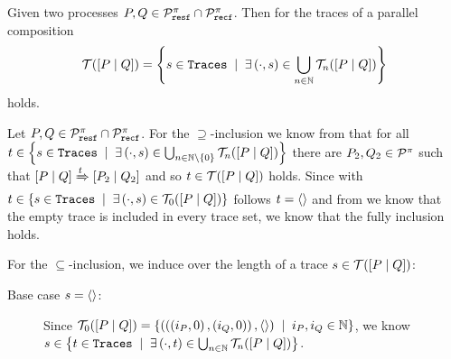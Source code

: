 \begin{lemma}
\label{lem_compositionality_traces_para}
Given two processes $P,Q\in\mathcal P^{\pi}_{\mathtt{resf}}\cap\mathcal P^{\pi}_{\mathtt{recf}}$. Then for the traces of a parallel composition
\[\traces[\procpar{P}{Q}]=\set[\exists\left(\cdot,s\right)\in\bigcup_{n\in\N}\tracesI{n}{P}{Q}]{s\in\tr}\]
holds.
\end{lemma}
\begin{prf}
Let $P,Q\in\mathcal P^{\pi}_{\mathtt{resf}}\cap\mathcal P^{\pi}_{\mathtt{recf}}$. For the $\supseteq$-inclusion we know from  that for all $t\in\set[\exists\left(\cdot,s\right)\in\bigcup_{n\in\N\setminus\set{0}}\tracesI{n}{P}{Q}]{s\in\tr}$ there are $P_2,Q_2\in\mathcal P^{\pi}$ such that $\left[P \mid Q\right]\xRightarrow{t}\left[P_2 \mid Q_2\right]$ and so $t\in\traces[\procpar{P}{Q}]$ holds. Since with $t\in\set[\exists\left(\cdot,s\right)\in\tracesI{0}{P}{Q}]{s\in\tr}$ follows $t=\langle\rangle$ and from  we know that the empty trace is included in every trace set, we know that the fully inclusion holds.


For the $\subseteq$-inclusion, we induce over the length of a trace $s\in\traces[\procpar{P}{Q}]$:
\begin{description}
\item[Base case $s=\langle\rangle$:] Since $\tracesI{0}{P}{Q} = \set[i_P,i_Q\in\N]{\left(\left(\left(i_P,0\right),\left(i_Q,0\right)\right),\eseq\right)}$, we know $s\in\set[\exists\left(\cdot,t\right)\in\bigcup_{n\in\N}\tracesI{n}{P}{Q}]{t\in\tr}$.


\end{description}
\end{prf}
